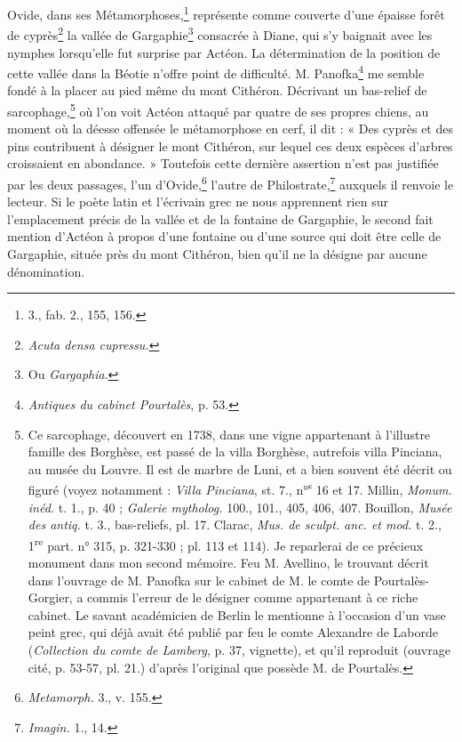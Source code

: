 \documentclass{article}
\begin{document}
Ovide, dans ses Métamorphoses,\footnote{3., fab. 2., 155, 156.} représente comme couverte d'une épaisse forêt de cyprès\footnote{\emph{Acuta densa cupressu.}} la vallée de Gargaphie\footnote{Ou \emph{Gargaphia}.} consacrée à Diane, qui s'y baignait avec les nymphes lorsqu'elle fut surprise par Actéon. La détermination de la position de cette vallée dans la Béotie n'offre point de difficulté. M. Panofka\footnote{\emph{Antiques du cabinet Pourtalès}, p. 53.} me semble fondé à la placer au pied même du mont Cithéron. Décrivant un bas-relief de sarcophage,\footnote{Ce sarcophage, découvert en 1738, dans une vigne appartenant à l'illustre famille des Borghèse, est passé de la villa Borghèse, autrefois villa Pinciana, au musée du Louvre. Il est de marbre de Luni, et a bien souvent été décrit ou figuré (voyez notamment : \emph{Villa Pinciana}, st. 7., n°\textsuperscript{s} 16 et 17. Millin, \emph{Monum. inéd.} t. 1., p. 40 ; \emph{Galerie mytholog.} 100., 101., 405, 406, 407. Bouillon, \emph{Musée des antiq.} t. 3., bas-reliefs, pl. 17. Clarac, \emph{Mus. de sculpt. anc. et mod.} t. 2., 1\textsuperscript{re} part. n° 315, p. 321-330 ; pl. 113 et 114). Je reparlerai de ce précieux monument dans mon second mémoire. Feu M. Avellino, le trouvant décrit dans l'ouvrage de M. Panofka sur le cabinet de M. le comte de Pourtalès-Gorgier, a commis l'erreur de le désigner comme appartenant à ce riche cabinet. Le savant académicien de Berlin le mentionne à l'occasion d'un vase peint grec, qui déjà avait été publié par feu le comte Alexandre de Laborde (\emph{Collection du comte de Lamberg}, p. 37, vignette), et qu'il reproduit (ouvrage cité, p. 53-57, pl. 21.) d'après l'original que possède M. de Pourtalès.} où l'on voit Actéon attaqué par quatre de ses propres chiens, au moment où la déesse offensée le métamorphose en cerf, il dit : « Des cyprès et des pins contribuent à désigner le mont Cithéron, sur lequel ces deux espèces d'arbres croissaient en abondance. » Toutefois cette dernière assertion n'est pas justifiée par les deux passages, l'un d'Ovide,\footnote{\emph{Metamorph.} 3., v. 155.} l'autre de Philostrate,\footnote{\emph{Imagin.} 1., 14.} auxquels il renvoie le lecteur. Si le poète latin et l'écrivain grec ne nous apprennent rien sur l'emplacement précis de la vallée et de la fontaine de Gargaphie, le second fait mention d'Actéon à propos d'une fontaine ou d'une source qui doit être celle de Gargaphie, située près du mont Cithéron, bien qu'il ne la désigne par aucune dénomination.
\end{document}
